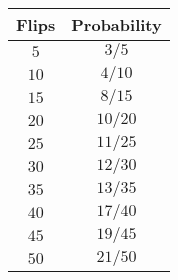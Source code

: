\begin{tabular}{cc} \toprule
Flips & Probability \\\midrule
$5$   & $3/5$       \\
$10$  & $4/10$      \\
$15$  & $8/15$      \\
$20$  & $10/20$     \\
$25$  & $11/25$     \\
$30$  & $12/30$     \\
$35$  & $13/35$     \\
$40$  & $17/40$     \\
$45$  & $19/45$     \\
$50$  & $21/50$     \\\bottomrule
\end{tabular}
